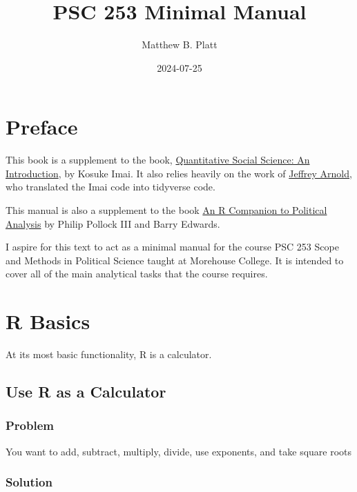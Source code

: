 \documentclass[
]{book}
\title{PSC 253 Minimal Manual}
\author{Matthew B. Platt}
\date{2024-07-25}
\begin{document}
\maketitle

{
\setcounter{tocdepth}{1}
\tableofcontents
}
\hypertarget{preface}{%
\chapter*{Preface}\label{preface}}

This book is a supplement to the book, \href{http://qss.princeton.press/}{Quantitative Social Science: An Introduction}, by Kosuke Imai. It also relies heavily on the work of \href{https://jrnold.github.io/qss-tidy/}{Jeffrey Arnold}, who translated the Imai code into tidyverse code.

This manual is also a supplement to the book \href{https://us.sagepub.com/en-us/nam/an-r-companion-to-political-analysis/book244716}{An R Companion to Political Analysis} by Philip Pollock III and Barry Edwards.

I aspire for this text to act as a minimal manual for the course PSC 253 Scope and Methods in Political Science taught at Morehouse College. It is intended to cover all of the main analytical tasks that the course requires.

\hypertarget{basic}{%
\chapter{R Basics}\label{basic}}

At its most basic functionality, R is a calculator.

\hypertarget{calculate}{%
\section{Use R as a Calculator}\label{calculate}}

\hypertarget{problem}{%
\subsection{Problem}\label{problem}}

You want to add, subtract, multiply, divide, use exponents, and take square roots

\hypertarget{solution}{%
\subsection{Solution}\label{solution}}
\end{document}
